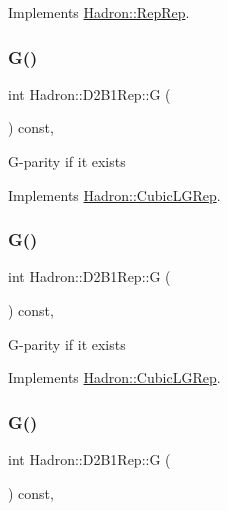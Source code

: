 Implements \mbox{\hyperlink{structHadron_1_1RepRep_a92c8802e5ed7afd7da43ccfd5b7cd92b}{Hadron\+::\+Rep\+Rep}}.

\mbox{\label{structHadron_1_1D2B1Rep_a23dd0673cd10907133263cfa9a566243}} 
\subsubsection{\texorpdfstring{G()}{G()}\hspace{0.1cm}{\footnotesize\ttfamily [1/3]}}
{\footnotesize\ttfamily int Hadron\+::\+D2\+B1\+Rep\+::G (\begin{DoxyParamCaption}{ }\end{DoxyParamCaption}) const\hspace{0.3cm}{\ttfamily [inline]}, {\ttfamily [virtual]}}

G-\/parity if it exists 

Implements \mbox{\hyperlink{structHadron_1_1CubicLGRep_ace26f7b2d55e3a668a14cb9026da5231}{Hadron\+::\+Cubic\+L\+G\+Rep}}.

\mbox{\label{structHadron_1_1D2B1Rep_a23dd0673cd10907133263cfa9a566243}} 
\subsubsection{\texorpdfstring{G()}{G()}\hspace{0.1cm}{\footnotesize\ttfamily [2/3]}}
{\footnotesize\ttfamily int Hadron\+::\+D2\+B1\+Rep\+::G (\begin{DoxyParamCaption}{ }\end{DoxyParamCaption}) const\hspace{0.3cm}{\ttfamily [inline]}, {\ttfamily [virtual]}}

G-\/parity if it exists 

Implements \mbox{\hyperlink{structHadron_1_1CubicLGRep_ace26f7b2d55e3a668a14cb9026da5231}{Hadron\+::\+Cubic\+L\+G\+Rep}}.

\mbox{\label{structHadron_1_1D2B1Rep_a23dd0673cd10907133263cfa9a566243}} 
\subsubsection{\texorpdfstring{G()}{G()}\hspace{0.1cm}{\footnotesize\ttfamily [3/3]}}
{\footnotesize\ttfamily int Hadron\+::\+D2\+B1\+Rep\+::G (\begin{DoxyParamCaption}{ }\end{DoxyParamCaption}) const\hspace{0.3cm}{\ttfamily [inline]}, {\ttfamily [virtual]}}

